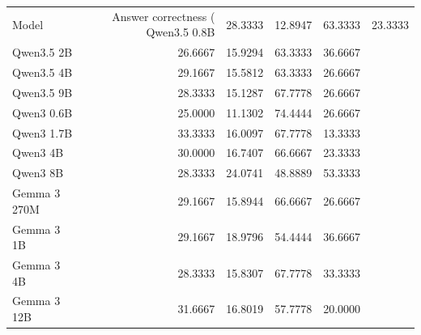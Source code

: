 \begin{tabular}{lrrrr}
\toprule
Model & Answer correctness (%
\midrule
Qwen3.5 0.8B & 28.3333 & 12.8947 & 63.3333 & 23.3333 \\
Qwen3.5 2B & 26.6667 & 15.9294 & 63.3333 & 36.6667 \\
Qwen3.5 4B & 29.1667 & 15.5812 & 63.3333 & 26.6667 \\
Qwen3.5 9B & 28.3333 & 15.1287 & 67.7778 & 26.6667 \\
Qwen3 0.6B & 25.0000 & 11.1302 & 74.4444 & 26.6667 \\
Qwen3 1.7B & 33.3333 & 16.0097 & 67.7778 & 13.3333 \\
Qwen3 4B & 30.0000 & 16.7407 & 66.6667 & 23.3333 \\
Qwen3 8B & 28.3333 & 24.0741 & 48.8889 & 53.3333 \\
Gemma 3 270M & 29.1667 & 15.8944 & 66.6667 & 26.6667 \\
Gemma 3 1B & 29.1667 & 18.9796 & 54.4444 & 36.6667 \\
Gemma 3 4B & 28.3333 & 15.8307 & 67.7778 & 33.3333 \\
Gemma 3 12B & 31.6667 & 16.8019 & 57.7778 & 20.0000 \\
\bottomrule
\end{tabular}
